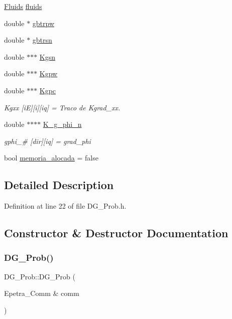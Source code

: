 \begin{DoxyCompactItemize}
\hyperlink{classFluids}{Fluids} \hyperlink{classDG__Prob_ad296d509627a1a75e0e23c26759f7ef6}{fluids}
\item 
double $\ast$ \hyperlink{classDG__Prob_af218fd61a961903027b7caf7d1157491}{gbtrpw}
\item 
double $\ast$ \hyperlink{classDG__Prob_a784a71f1e8434f56da43c448cf5b6686}{gbtrsn}
\item 
double $\ast$$\ast$$\ast$ \hyperlink{classDG__Prob_ade54cb91ab3dd60ff55eec41dfaa4ff6}{Kgsn}
\item 
double $\ast$$\ast$$\ast$ \hyperlink{classDG__Prob_afa0365623d5aacbc7d8bd6d288cd6964}{Kgpw}
\item 
double $\ast$$\ast$$\ast$ \hyperlink{classDG__Prob_aebe56d3eabfeae5d358deb3f4e2ef1f6}{Kgpc}
\begin{DoxyCompactList}\small\item\em Kgxx \mbox{[}iE\mbox{]}\mbox{[}i\mbox{]}\mbox{[}iq\mbox{]} = Traco de Kgrad\+\_\+xx. \end{DoxyCompactList}\item 
double $\ast$$\ast$$\ast$$\ast$ \hyperlink{classDG__Prob_acff73e57edccd78892771da628f85775}{K\+\_\+g\+\_\+phi\+\_\+n}
\begin{DoxyCompactList}\small\item\em gphi\+\_\+\# \mbox{[}dir\mbox{]}\mbox{[}iq\mbox{]} = grad\+\_\+phi \end{DoxyCompactList}\item 
bool \hyperlink{classDG__Prob_a834d65fdd0302355c89d3896433a7338}{memoria\+\_\+alocada} = false
\end{DoxyCompactItemize}


\subsection{Detailed Description}


Definition at line 22 of file D\+G\+\_\+\+Prob.\+h.



\subsection{Constructor \& Destructor Documentation}
\mbox{\label{classDG__Prob_aaa40b75df07b3580d72d012d3e16649e}} 
\subsubsection{\texorpdfstring{D\+G\+\_\+\+Prob()}{DG\_Prob()}}
{\footnotesize\ttfamily D\+G\+\_\+\+Prob\+::\+D\+G\+\_\+\+Prob (\begin{DoxyParamCaption}\item[{Epetra\+\_\+\+Comm \&}]{comm }\end{DoxyParamCaption})}



